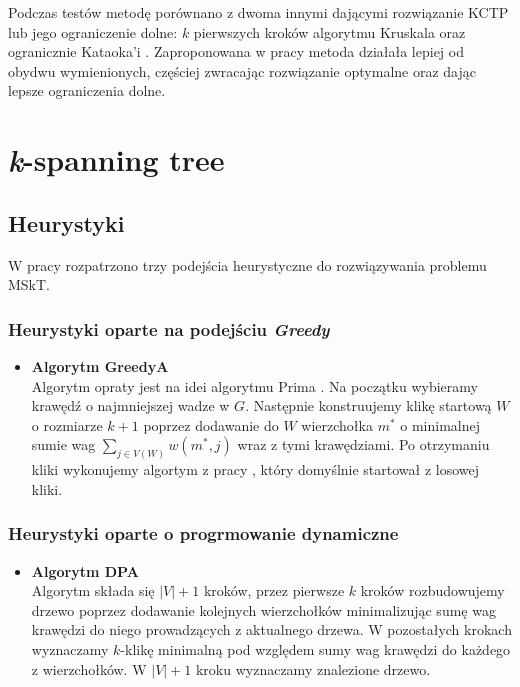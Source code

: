 \documentclass[12pt]{article}
\begin{document}
Podczas testów metodę porównano z dwoma innymi dającymi rozwiązanie KCTP lub jego ograniczenie dolne: $k$ pierwszych kroków algorytmu Kruskala \cite{kruskal} oraz ogranicznie Kataoka'i \cite{rooted}. Zaproponowana w pracy metoda działała lepiej od obydwu wymienionych, częściej zwracając rozwiązanie optymalne oraz dając lepsze ograniczenia dolne.

\section{\textit{k}-spanning tree}

\subsection{Heurystyki}

W pracy \cite{heuristis} rozpatrzono trzy podejścia heurystyczne do rozwiązywania problemu MSkT.

\subsubsection{Heurystyki oparte na podejściu \textit{Greedy}}

\begin{itemize}
  \item \textbf{Algorytm GreedyA}\\
        Algorytm opraty jest na idei algorytmu Prima \cite{prim}. Na początku wybieramy krawędź o najmniejszej wadze w $G$. Następnie konstruujemy klikę startową $W$ o rozmiarze $k+1$ poprzez dodawanie do $W$ wierzchołka $m^*$ o minimalnej sumie wag $\sum_{j \in V(W)}{w(m^*,j)}$ wraz z tymi krawędziami. Po otrzymaniu kliki wykonujemy algortym z pracy \cite{greedy}, który domyślnie startował z losowej kliki.
\end{itemize}

\subsubsection{Heurystyki oparte o progrmowanie dynamiczne}

\begin{itemize}
  \item \textbf{Algorytm DPA}\\
        Algorytm składa się $|V| + 1$ kroków, przez pierwsze $k$ kroków rozbudowujemy drzewo poprzez dodawanie kolejnych wierzchołków minimalizując sumę wag krawędzi do niego prowadzących z aktualnego drzewa. W pozostałych krokach wyznaczamy $k$-klikę minimalną pod względem sumy wag krawędzi do każdego z wierzchołków. W $|V| + 1$ kroku wyznaczamy znalezione drzewo.
\end{itemize}
\end{document}
